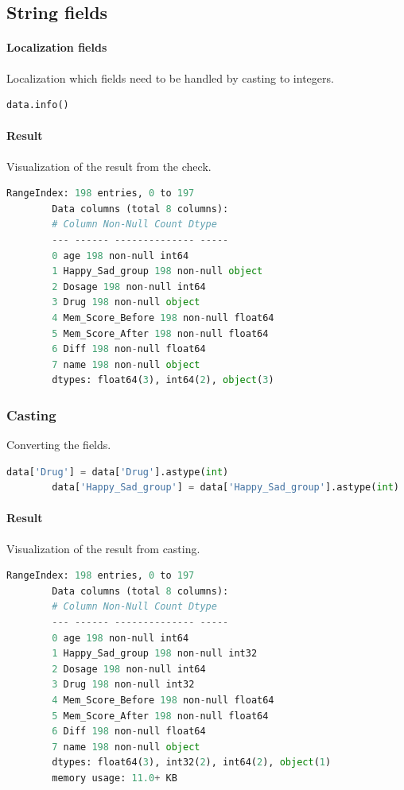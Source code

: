 \documentclass{article}
\begin{document}
    \subsection{String fields}
    \paragraph{Localization fields}
    Localization which fields need to be handled by casting to integers.
    \begin{lstlisting}[language=Python]
        data.info()
    \end{lstlisting}
    \paragraph{Result}
    Visualization of the result from the check.
    \begin{lstlisting}[language=Python]
        RangeIndex: 198 entries, 0 to 197
        Data columns (total 8 columns):
        # Column Non-Null Count Dtype
        --- ------ -------------- -----
        0 age 198 non-null int64
        1 Happy_Sad_group 198 non-null object
        2 Dosage 198 non-null int64
        3 Drug 198 non-null object
        4 Mem_Score_Before 198 non-null float64
        5 Mem_Score_After 198 non-null float64
        6 Diff 198 non-null float64
        7 name 198 non-null object
        dtypes: float64(3), int64(2), object(3)
    \end{lstlisting}
    \subsubsection{Casting}
    Converting the fields.
    \begin{lstlisting}[language=Python]
        data['Drug'] = data['Drug'].astype(int)
        data['Happy_Sad_group'] = data['Happy_Sad_group'].astype(int)
    \end{lstlisting}
    \paragraph{Result}
    Visualization of the result from casting.
    \begin{lstlisting}[language=Python]
        RangeIndex: 198 entries, 0 to 197
        Data columns (total 8 columns):
        # Column Non-Null Count Dtype
        --- ------ -------------- -----
        0 age 198 non-null int64
        1 Happy_Sad_group 198 non-null int32
        2 Dosage 198 non-null int64
        3 Drug 198 non-null int32
        4 Mem_Score_Before 198 non-null float64
        5 Mem_Score_After 198 non-null float64
        6 Diff 198 non-null float64
        7 name 198 non-null object
        dtypes: float64(3), int32(2), int64(2), object(1)
        memory usage: 11.0+ KB
    \end{lstlisting}
    \newpage
\end{document}
